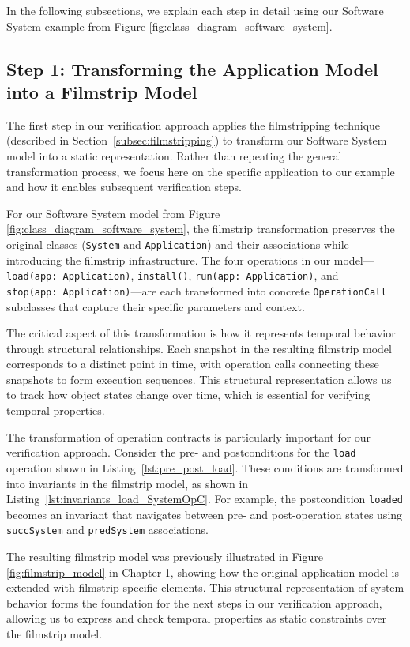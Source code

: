 In the following subsections, we explain each step in detail using our Software 
System example from Figure \ref{fig:class_diagram_software_system}.


\subsection{Step 1: Transforming the Application Model into a Filmstrip Model}

\hspace{1cm} The first step in our verification approach applies the filmstripping technique (described in Section~\ref{subsec:filmstripping}) to transform our Software System model into a static representation. Rather than repeating the general transformation process, we focus here on the specific application to our example and how it enables subsequent verification steps.

For our Software System model from Figure \ref{fig:class_diagram_software_system}, the filmstrip transformation preserves the original classes (\texttt{System} and \texttt{Application}) and their associations while introducing the filmstrip infrastructure. The four operations in our model—\texttt{load(app:~Application)}, \texttt{install()}, \texttt{run(app:~Application)}, and \texttt{stop(app:~Application)}—are each transformed into concrete \texttt{OperationCall} subclasses that capture their specific parameters and context.

The critical aspect of this transformation is how it represents temporal behavior through structural relationships. Each snapshot in the resulting filmstrip model corresponds to a distinct point in time, with operation calls connecting these snapshots to form execution sequences. This structural representation allows us to track how object states change over time, which is essential for verifying temporal properties.

The transformation of operation contracts is particularly important for our verification approach. Consider the pre- and postconditions for the \texttt{load} operation shown in Listing~\ref{lst:pre_post_load}. These conditions are transformed into invariants in the filmstrip model, as shown in Listing~\ref{lst:invariants_load_SystemOpC}. For example, the postcondition \texttt{loaded} becomes an invariant that navigates between pre- and post-operation states using \texttt{succSystem} and \texttt{predSystem} associations.

The resulting filmstrip model was previously illustrated in Figure \ref{fig:filmstrip_model} in Chapter 1, showing how the original application model is extended with filmstrip-specific elements. This structural representation of system behavior forms the foundation for the next steps in our verification approach, allowing us to express and check temporal properties as static constraints over the filmstrip model.

